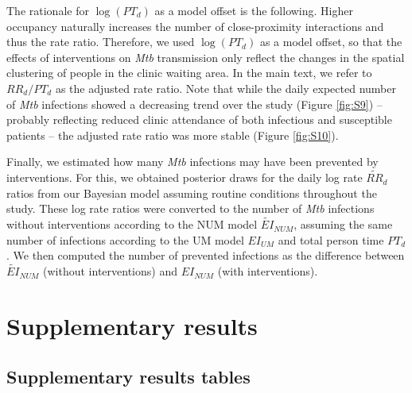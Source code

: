\documentclass[11pt]{article}
\begin{document}
The rationale for \(\log(PT_{d})\) as a model offset is the following. Higher occupancy naturally increases the number of close-proximity interactions and thus the rate ratio. Therefore, we used \(\log(PT_{d})\) as a model offset, so that the effects of interventions on \emph{Mtb} transmission only reflect the changes in the spatial clustering of people in the clinic waiting area. In the main text, we refer to \(RR_{d}/PT_{d}\) as the adjusted rate ratio. Note that while the daily expected number of \emph{Mtb} infections showed a decreasing trend over the study (Figure \ref{fig:S9}) -- probably reflecting reduced clinic attendance of both infectious and susceptible patients -- the adjusted rate ratio was more stable (Figure \ref{fig:S10}).

Finally, we estimated how many \emph{Mtb} infections may have been prevented by interventions. For this, we obtained posterior draws for the daily log rate \({\widetilde{RR}}_{d}\) ratios from our Bayesian model assuming routine conditions throughout the study. These log rate ratios were converted to the number of \emph{Mtb} infections without interventions according to the NUM model \({\widetilde{EI}}_{NUM}\), assuming the same number of infections according to the UM model \({EI}_{UM}\) and total person time \(PT_{d}\). We then computed the number of prevented infections as the difference between \({\widetilde{EI}}_{NUM}\) (without interventions) and \({EI}_{NUM}\) (with interventions).

\section{Supplementary results}\label{appendix-d}

\subsection{Supplementary results tables}\label{supplementary-results-tables}

\label{tab:S2}
\end{document}

